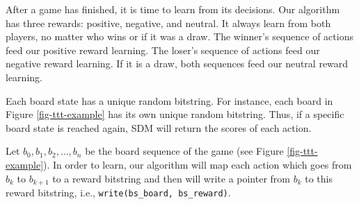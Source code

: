 
After a game has finished, it is time to learn from its decisions. Our algorithm has three rewards: positive, negative, and neutral. It always learn from both players, no matter who wins or if it was a draw. The winner's sequence of actions feed our positive reward learning. The loser's sequence of actions feed our negative reward learning. If it is a draw, both sequences feed our neutral reward learning.

Each board state has a unique random bitstring. For instance, each board in Figure \ref{fig-ttt-example} has its own unique random bitstring. Thus, if a specific board state is reached again, SDM will return the scores of each action.

Let $b_0, b_1, b_2, \dots, b_n$ be the board sequence of the game (see Figure \ref{fig-ttt-example}). In order to learn, our algorithm will map each action which goes from $b_k$ to $b_{k+1}$ to a reward bitstring and then will write a pointer from $b_k$ to this reward bitstring, i.e., \lstinline{write(bs_board, bs_reward)}.

